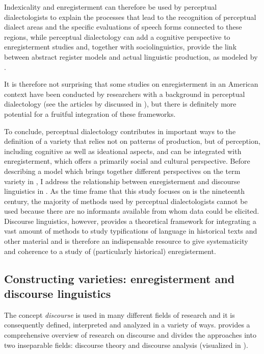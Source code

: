 Indexicality and enregisterment can therefore be used by perceptual dialectologists to explain the processes that lead to the recognition of perceptual dialect areas and the specific evaluations of speech forms connected to these regions, while perceptual dialectology can add a cognitive perspective to enregisterment studies and, together with sociolinguistics, provide the link between abstract register models and actual linguistic production, as modeled by \citet{Spitzmuller10062016, Spitzmuller2013}.


It is therefore not surprising that some studies on enregisterment in an American context have been conducted by researchers with a background in perceptual dialectology (see the articles by \citealt{CampbellKibler2012,CampbellKibler2015,Remlinger2009,Remlinger2009b} discussed in ), but there is definitely more potential for a fruitful integration of these frameworks.

To conclude, perceptual dialectology contributes in important ways to the definition of a variety that relies not on patterns of production, but of perception, including cognitive as well as ideational aspects, and can be integrated with enregisterment, which offers a primarily social and cultural perspective. Before describing a model which brings together different perspectives on the term variety in , I address the relationship between enregisterment and discourse linguistics in . As the time frame that this study focuses on is the nineteenth century, the majority of methods used by perceptual dialectologists cannot be used because there are no informants available from whom data could be elicited. Discourse linguistics, however, provides a theoretical framework for integrating a vast amount of methods to study typifications of language in historical texts and other material and is therefore an indispensable resource to give systematicity and coherence to a study of (particularly historical) enregisterment.

\subsection{Constructing varieties: enregisterment and discourse linguistics}
\label{bkm:Ref506891065}\hypertarget{Toc63021214}{}
The concept \textit{discourse} is used in many different fields of research and it is consequently defined, interpreted and analyzed in a variety of ways. \citet{Angermuller2014} provides a comprehensive overview of research on discourse and divides the approaches into two inseparable fields: discourse theory and discourse analysis (visualized in ).


